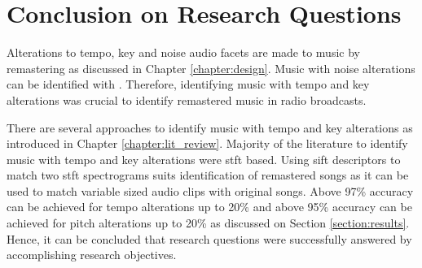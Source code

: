 \section{Conclusion on Research Questions}

Alterations to tempo, key and noise audio facets are made to music by remastering
as discussed in Chapter \ref{chapter:design}. Music with noise alterations can be
identified with \cite{Nishan}.
Therefore, identifying music with tempo and key alterations was crucial to identify remastered
music in radio broadcasts.

There are several approaches to identify music with tempo and key alterations as introduced in
Chapter \ref{chapter:lit_review}. Majority of the literature to identify music with tempo and
key alterations were \ac{stft} based. Using \ac{sift} descriptors to match two \ac{stft} spectrograms
suits identification of remastered songs as it can be used to match variable sized audio clips with 
original songs. Above 97\% accuracy can be achieved for tempo alterations up to 20\% and above 95\%
accuracy can be achieved for pitch alterations up to 20\% as discussed on Section \ref{section:results}.    
Hence, it can be concluded that research questions were successfully answered by accomplishing research
objectives. 
